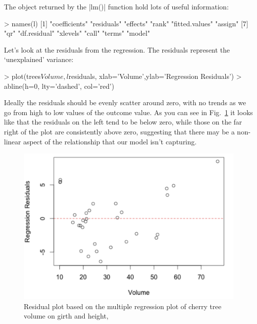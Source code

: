 The object returned by the |lm()| function hold lots of useful information:
%
\begin{R}
> names(l)
 [1] "coefficients"  "residuals"     "effects"       "rank"          "fitted.values" "assign"
 [7] "qr"            "df.residual"   "xlevels"       "call"          "terms"         "model"
\end{R}
%
Let's look at the residuals from the regression. The residuals represent the `unexplained' variance:
\begin{R}
> plot(trees$Volume,l$residuals, xlab='Volume',ylab='Regression Residuals')
> abline(h=0, lty='dashed', col='red')
\end{R}
%
Ideally the residuals should be evenly scatter around zero, with no trends as we go from high to low values of the outcome value.  As you can see in Fig.~\ref{fig:trees-resid} it looks like that the residuals on the left tend to be below zero, while those on the far right of the plot are consistently above zero, suggesting that there may be a non-linear aspect of the relationship that our model isn't capturing.
%
\begin{figure}[htbp]
\centering
\includegraphics[width=0.65\columnwidth]{./figures/hands-on4/trees-residuals.pdf}
\caption{Residual plot based on the multiple regression plot of cherry tree volume on girth and height,\label{fig:trees-resid}}
\end{figure}



